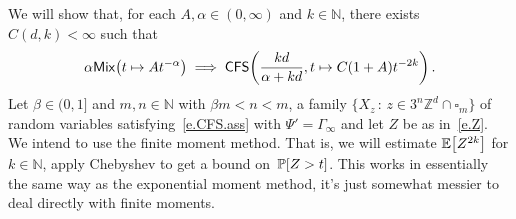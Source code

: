 \documentclass[11pt]{article} %
\let\oldsquare\square %
\renewcommand{\square}{\oldsquare}
\numberwithin{equation}{section}
\theoremstyle{definition}
\let\originalleft\left
\let\originalright\right
\renewcommand{\left}{\mathopen{}\mathclose\bgroup\originalleft}
\renewcommand{\right}{\aftergroup\egroup\originalright}
\newcommand*{\N}{\ensuremath{\mathbb{N}}}
\newcommand*{\Zd}{\ensuremath{\mathbb{Z}^d}}
\newcommand{\cu}{\square}
\renewcommand{\P}{\mathbb{P}}
\newcommand{\E}{\mathbb{E}}
\newcommand{\CFS}{\mathsf{CFS}}
\begin{document}
We will show that, for each $A,\alpha \in (0,\infty)$ and $k\in\N$, there exists ~$C(d,k)<\infty$ such that 
\begin{equation} 
\label{e.alphamix.to.CFS}
\alpha\mathsf{Mix}\left(t\mapsto At^{-\alpha} \right)
\implies \CFS\left( \frac{kd}{\alpha+kd} ,t\mapsto C(1+A)t^{-2k}\right)
\,.
\end{equation}
Let $\beta \in (0,1]$ and $m,n\in\N$ with $\beta m<n<m$, a family $\{ X_z \,:\, z\in 3^n\Zd\cap \cu_m\}$ of random variables satisfying~\eqref{e.CFS.ass} with $\Psi' = \Gamma_\infty$ and let $Z$ be as in~\eqref{e.Z}. We intend to use the finite moment method.
That is, we will estimate $\E\left[ Z^{2k} \right]$ for $k\in\N$, apply Chebyshev to get a bound on~$\P\left[ Z>t \right]$. This works in essentially the same way as the exponential moment method, it's just somewhat messier to deal directly with finite moments. 

\smallskip
\end{document}
